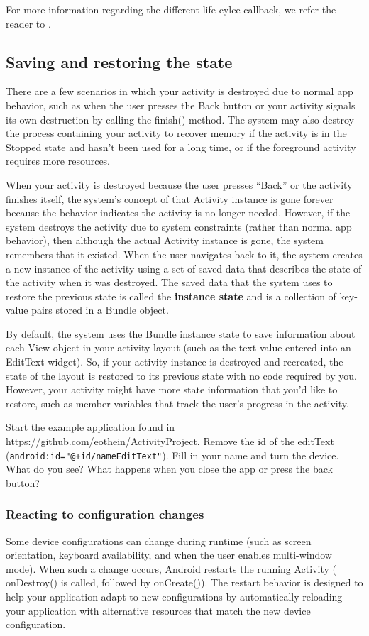 For more information regarding the different life cylce callback, we refer the reader to \cite{Developers19}.

\subsection{Saving and restoring the state}
There are a few scenarios in which your activity is destroyed due to normal app behavior, such as when the user presses the Back button or your activity signals its own destruction by calling the finish() method.
The system may also destroy the process containing your activity to recover memory if the activity is in the Stopped state and hasn't been used for a long time, or if the foreground activity requires more resources.

When your activity is destroyed because the user presses  ``Back'' or the activity finishes itself, the system's concept of that Activity instance is gone forever because the behavior indicates the activity is no longer needed.
However, if the system destroys the activity due to system constraints (rather than normal app behavior), then although the actual Activity instance is gone, the system remembers that it existed.
When the user navigates back to it, the system creates a new instance of the activity using a set of saved data that describes the state of the activity when it was destroyed.
The saved data that the system uses to restore the previous state is called the \textbf{instance state} and is a collection of key-value pairs stored in a Bundle object.

By default, the system uses the Bundle instance state to save information about each View object in your activity layout (such as the text value entered into an EditText widget).
So, if your activity instance is destroyed and recreated, the state of the layout is restored to its previous state with no code required by you.
However, your activity might have more state information that you'd like to restore, such as member variables that track the user's progress in the activity.

\begin{exercise}
	Start the example application found in \url{https://github.com/eothein/ActivityProject}.
	Remove the id of the editText (\texttt{android:id="@+id/nameEditText"}).
	Fill in your name and turn the device.
	What do you see? What happens when you close the app or press the back button?
\end{exercise}

\subsubsection{Reacting to configuration changes}
Some device configurations can change during runtime (such as screen orientation, keyboard availability, and when the user enables multi-window mode).
When such a change occurs, Android restarts the running Activity ( onDestroy() is called, followed by onCreate()).
The restart behavior is designed to help your application adapt to new configurations by automatically reloading your application with alternative resources that match the new device configuration.

